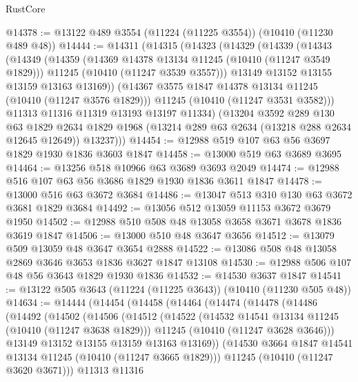 \begin{lexlean}{RustCore}
\begin{coremodule}
@14378 := @13122 @489 @3554 (@11224 (@11225 @3554)) (@10410 (@11230 @489 @48))
@14444 := @14311
    (@14315
      (@14323
        (@14329
          (@14339
            (@14343
              (@14349
                (@14359
                  (@14369 @14378 @13134 @11245 (@10410 (@11247 @3549 @1829)))
                  @11245
                  (@10410 (@11247 @3539 @3557)))
                @13149
                @13152
                @13155
                @13159
                @13163
                @13169))
            (@14367 @3575 @1847 @14378 @13134 @11245 (@10410 (@11247 @3576 @1829)))
            @11245
            (@10410 (@11247 @3531 @3582)))
          @11313
          @11316
          @11319
          @13193
          @13197
          @11334)
        (@13204
          @3592
          @289
          @130
          @63
          @1829
          @2634
          @1829
          @1968
          (@13214 @289 @63 @2634 (@13218 @288 @2634 @12645 @12649))
          @13237)))
@14454 := @12988 @519 @107 @63 @56 @3697 @1829 @1930 @1836 @3603 @1847
@14458 := @13000 @519 @63 @3689 @3695
@14464 := @13256 @518 @10966 @63 @3689 @3693 @2049
@14474 := @12988 @516 @107 @63 @56 @3686 @1829 @1930 @1836 @3611 @1847
@14478 := @13000 @516 @63 @3672 @3684
@14486 := @13047 @513 @310 @130 @63 @3672 @3681 @1829 @3684
@14492 := @13056 @512 @13059 @11153 @3672 @3679 @1950
@14502 := @12988 @510 @508 @48 @13058 @3658 @3671 @3678 @1836 @3619 @1847
@14506 := @13000 @510 @48 @3647 @3656
@14512 := @13079 @509 @13059 @48 @3647 @3654 @2888
@14522 := @13086 @508 @48 @13058 @2869 @3646 @3653 @1836 @3627 @1847 @13108
@14530 := @12988 @506 @107 @48 @56 @3643 @1829 @1930 @1836
@14532 := @14530 @3637 @1847
@14541 := @13122 @505 @3643 (@11224 (@11225 @3643)) (@10410 (@11230 @505 @48))
@14634 := @14444
    (@14454
      (@14458
        (@14464
          (@14474
            (@14478
              (@14486
                (@14492
                  (@14502
                    (@14506
                      (@14512
                        (@14522
                          (@14532 @14541 @13134 @11245 (@10410 (@11247 @3638 @1829)))
                          @11245
                          (@10410 (@11247 @3628 @3646)))
                        @13149
                        @13152
                        @13155
                        @13159
                        @13163
                        @13169))
                    (@14530 @3664 @1847 @14541 @13134 @11245 (@10410 (@11247 @3665 @1829)))
                    @11245
                    (@10410 (@11247 @3620 @3671)))
                  @11313
                  @11316

\end{coremodule}
\end{lexlean}
